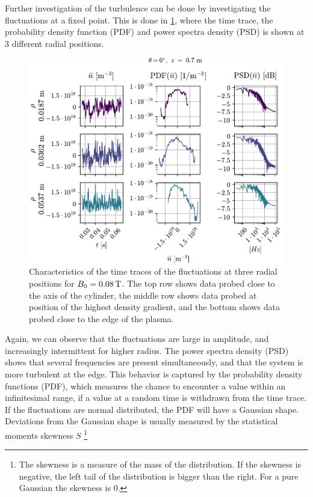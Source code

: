 Further investigation of the turbulence can be done by investigating the fluctuations at a fixed point.
This is done in \cref{fig:combinedPlots008}, where the time trace, the probability density function (PDF) and power spectra density (PSD) is shown at $3$ different radial positions.
%
\begin{figure}[htb]
    \centering
    \includegraphics{fig/results/combinedPlots/008T}
    \caption{Characteristics of the time traces of the fluctuations at three radial positions for $B_0=0.08\, \text{T}$.
        The top row shows data probed close to the axis of the cylinder,
        the middle row shows data probed at position of the highest density gradient,
        and the bottom shows data probed close to the edge of the plasma.
    }
    \label{fig:combinedPlots008}
\end{figure}
%
Again, we can observe that the fluctuations are large in amplitude, and increasingly intermittent for higher radius.
The power spectra density (PSD) shows that several frequencies are present simultaneously, and that the system is more turbulent at the edge.
This behavior is captured by the probability density functions (PDF), which measures the chance to encounter a value within an infinitesimal range, if a value at a random time is withdrawn from the time trace.
If the fluctuations are normal distributed, the PDF will have a Gaussian shape.
Deviations from the Gaussian shape is usually measured by the statistical moments skewness $S$%
%
\footnote{
    The skewness is a measure of the mass of the distribution.
    If the skewness is negative, the left tail of the distribution is bigger than the right.
    For a pure Gaussian the skewness is 0.
}
